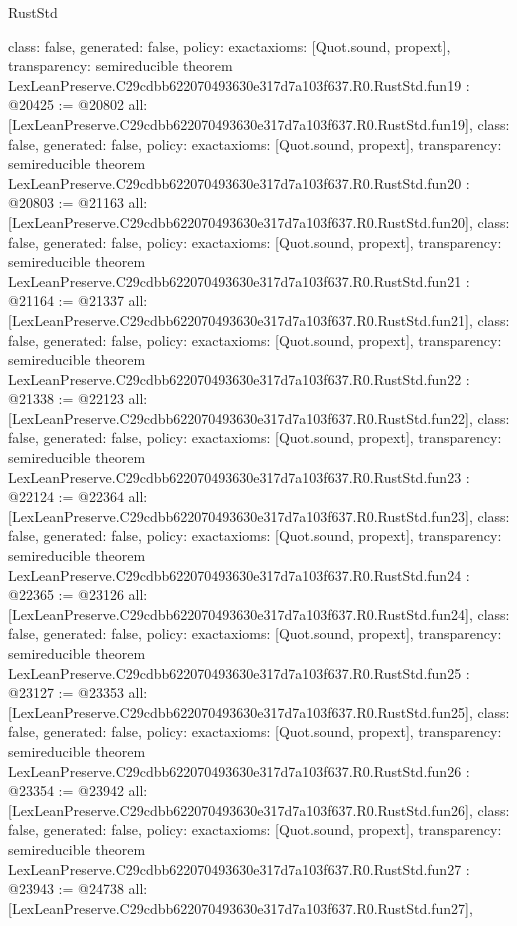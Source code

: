 \begin{lexlean}{RustStd}
\begin{coremodule}
{  class: false,
  generated: false,
  policy: exact{axioms: [Quot.sound, propext]},
  transparency: semireducible
}
theorem LexLeanPreserve.C29cdbb622070493630e317d7a103f637.R0.RustStd.fun19 : @20425 := @20802 {
  all: [LexLeanPreserve.C29cdbb622070493630e317d7a103f637.R0.RustStd.fun19],
  class: false,
  generated: false,
  policy: exact{axioms: [Quot.sound, propext]},
  transparency: semireducible
}
theorem LexLeanPreserve.C29cdbb622070493630e317d7a103f637.R0.RustStd.fun20 : @20803 := @21163 {
  all: [LexLeanPreserve.C29cdbb622070493630e317d7a103f637.R0.RustStd.fun20],
  class: false,
  generated: false,
  policy: exact{axioms: [Quot.sound, propext]},
  transparency: semireducible
}
theorem LexLeanPreserve.C29cdbb622070493630e317d7a103f637.R0.RustStd.fun21 : @21164 := @21337 {
  all: [LexLeanPreserve.C29cdbb622070493630e317d7a103f637.R0.RustStd.fun21],
  class: false,
  generated: false,
  policy: exact{axioms: [Quot.sound, propext]},
  transparency: semireducible
}
theorem LexLeanPreserve.C29cdbb622070493630e317d7a103f637.R0.RustStd.fun22 : @21338 := @22123 {
  all: [LexLeanPreserve.C29cdbb622070493630e317d7a103f637.R0.RustStd.fun22],
  class: false,
  generated: false,
  policy: exact{axioms: [Quot.sound, propext]},
  transparency: semireducible
}
theorem LexLeanPreserve.C29cdbb622070493630e317d7a103f637.R0.RustStd.fun23 : @22124 := @22364 {
  all: [LexLeanPreserve.C29cdbb622070493630e317d7a103f637.R0.RustStd.fun23],
  class: false,
  generated: false,
  policy: exact{axioms: [Quot.sound, propext]},
  transparency: semireducible
}
theorem LexLeanPreserve.C29cdbb622070493630e317d7a103f637.R0.RustStd.fun24 : @22365 := @23126 {
  all: [LexLeanPreserve.C29cdbb622070493630e317d7a103f637.R0.RustStd.fun24],
  class: false,
  generated: false,
  policy: exact{axioms: [Quot.sound, propext]},
  transparency: semireducible
}
theorem LexLeanPreserve.C29cdbb622070493630e317d7a103f637.R0.RustStd.fun25 : @23127 := @23353 {
  all: [LexLeanPreserve.C29cdbb622070493630e317d7a103f637.R0.RustStd.fun25],
  class: false,
  generated: false,
  policy: exact{axioms: [Quot.sound, propext]},
  transparency: semireducible
}
theorem LexLeanPreserve.C29cdbb622070493630e317d7a103f637.R0.RustStd.fun26 : @23354 := @23942 {
  all: [LexLeanPreserve.C29cdbb622070493630e317d7a103f637.R0.RustStd.fun26],
  class: false,
  generated: false,
  policy: exact{axioms: [Quot.sound, propext]},
  transparency: semireducible
}
theorem LexLeanPreserve.C29cdbb622070493630e317d7a103f637.R0.RustStd.fun27 : @23943 := @24738 {
  all: [LexLeanPreserve.C29cdbb622070493630e317d7a103f637.R0.RustStd.fun27],
}
\end{coremodule}
\end{lexlean}
